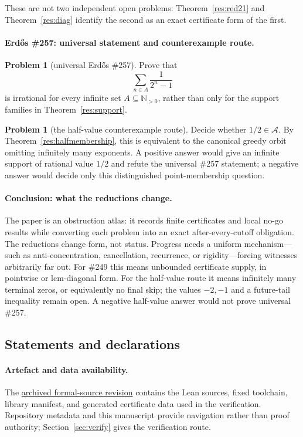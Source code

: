 \documentclass[11pt]{article}
\newcommand{\commit}{312b96c0d149ed466725c62d4ef24cfc91bca34e}
\newcommand{\sourceurl}{https://github.com/wcook04/plectis-lean-erdos249-257/tree/\commit}
\theoremstyle{definition}
\newtheorem{problem}[theorem]{Problem}
\theoremstyle{remark}
\newcommand{\Npos}{\mathbb{N}_{>0}}
\begin{document}
These are not two independent open problems: Theorem~\ref{res:red21} and
Theorem~\ref{res:diag} identify the second as an exact certificate form of
the first.

\paragraph{Erd\H{o}s \#257: universal statement and counterexample route.}
\begin{problem}[universal Erd\H{o}s \#257]
Prove that
\[
  \sum_{n\in A}\frac{1}{2^n-1}
\]
is irrational for every infinite set $A\subseteq\Npos$, rather than only for the
support families in Theorem~\ref{res:support}.
\end{problem}

\begin{problem}[the half-value counterexample route]
Decide whether $1/2\in\mathcal A$.  By
Theorem~\ref{res:halfmembership}, this is equivalent to the canonical greedy
orbit omitting infinitely many exponents.  A positive answer would give an
infinite support of rational value $1/2$ and refute the universal \#257
statement; a negative answer would decide only this distinguished
point-membership question.
\end{problem}

\paragraph{Conclusion: what the reductions change.}
The paper is an obstruction atlas: it records finite certificates and local
no-go results while converting each problem into an exact after-every-cutoff
obligation.  The reductions change form, not status.  Progress needs a uniform
mechanism---such as anti-concentration, cancellation, recurrence, or
rigidity---forcing witnesses arbitrarily far out.  For \#249 this means
unbounded certificate supply, in pointwise or lcm-diagonal form.  For the
half-value route it means infinitely many terminal zeros, or equivalently no
final skip; the values \(-2,-1\) and a future-tail inequality remain open.
A negative half-value answer would not prove universal \#257.

\subsection*{Statements and declarations}

\paragraph{Artefact and data availability.} The
\href{\sourceurl}{archived formal-source revision} contains the Lean sources,
fixed toolchain, library manifest, and generated certificate data used in the
verification. Repository metadata and this manuscript provide navigation
rather than proof authority; Section~\ref{sec:verify} gives the verification
route.
\end{document}
